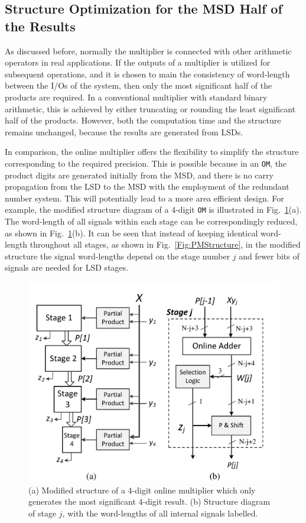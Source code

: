 \documentclass[conference]{IEEEtran}
\begin{document}
\subsection{Structure Optimization for the MSD Half of the Results}
As discussed before, normally the multiplier is connected with other arithmetic operators in real applications. If the outputs of a multiplier is utilized for subsequent operations, and it is chosen to main the consistency of word-length between the I/Os of the system, then only the most significant half of the products are required. In a conventional multiplier with standard binary arithmetic, this is achieved by either truncating or rounding the least significant half of the products. However, both the computation time and the structure remains unchanged, because the results are generated from LSDs.

In comparison, the online multiplier offers the flexibility to simplify the structure corresponding to the required precision. This is possible because in an \texttt{OM}, the product digits are generated initially from the MSD, and there is no carry propagation from the LSD to the MSD with the employment of the redundant number system. This will potentially lead to a more area efficient design. For example, the modified structure diagram of a 4-digit \texttt{OM} is illustrated in Fig.~\ref{Fig:PMStructure_MSDhalf}(a). The word-length of all signals within each stage can be correspondingly reduced, as shown in Fig.~\ref{Fig:PMStructure_MSDhalf}(b). It can be seen that instead of keeping identical word-length throughout all stages, as shown in Fig.~\ref{Fig:PMStructure}, in the modified structure the signal word-lengths depend on the stage number $j$ and fewer bits of signals are needed for LSD stages.

\begin{figure}[tbp]
	\centering
	\includegraphics[width=.5\textwidth]{./Figures/ParallelMult_MSDhalf.pdf}
	\caption{(a) Modified structure of a 4-digit online multiplier which only generates the most significant 4-digit result. (b) Structure diagram of stage $j$, with the word-lengths of all internal signals labelled.}
	\label{Fig:PMStructure_MSDhalf}
	\vspace{-2ex}
\end{figure}
\end{document}
